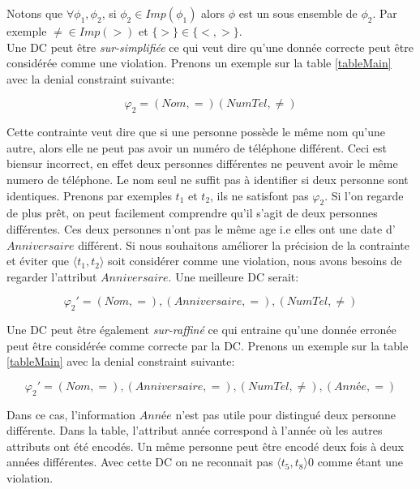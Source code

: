 \documentclass[letterpaper, 12pt]{report}
\theoremstyle{definition}
\begin{document}
Notons que $\forall \phi_1,\phi_2$, si $\phi_2 \in Imp(\phi_1)$ alors $\phi$ est un sous ensemble de $\phi_2$. Par exemple $\neq \in Imp(>)$ et $\{ > \} \in \{<,> \}$.\\

Une DC peut être \emph{sur-simplifiée} ce qui veut dire qu'une donnée correcte peut être considérée comme une violation. Prenons un exemple sur la table \ref{tableMain} avec la denial constraint suivante:

$$\varphi_2 = (Nom,=)(NumTel,\neq) $$

Cette contrainte veut dire que si une personne possède le même nom qu'une autre, alors elle ne peut pas avoir un numéro de téléphone différent. Ceci est biensur incorrect, en effet deux personnes différentes ne peuvent avoir le même numero de téléphone. Le nom seul ne suffit pas à identifier si deux personne sont identiques. Prenons par exemples $t_1$ et $t_2$, ils ne satisfont pas $\varphi_2$. Si l'on regarde de plus prêt, on peut facilement comprendre qu'il s'agit de deux personnes différentes. Ces deux personnes n'ont pas le même age i.e elles ont une date d'$Anniversaire$ différent. Si nous souhaitons améliorer la précision de la contrainte et éviter que $\langle t_1,t_2\rangle$ soit considérer comme une violation, nous avons besoins de regarder l'attribut $Anniversaire$. Une meilleure DC serait:

$$\varphi_2' = (Nom,=),(Anniversaire,=),(NumTel,\neq) $$

Une DC peut être également \emph{sur-raffiné} ce qui entraine qu'une donnée erronée peut être considérée comme correcte par la DC. Prenons un exemple sur la table \ref{tableMain} avec la denial constraint suivante:

$$\varphi_2' = (Nom,=),(Anniversaire,=),(NumTel,\neq),(Année,=) $$

Dans ce cas, l'information $Année$ n'est pas utile pour distingué deux personne différente. Dans la table, l'attribut année correspond à l'année où les autres attributs ont été encodés. Un même personne peut être encodé deux fois à deux années différentes. Avec cette DC on ne reconnait pas $\langle t_5,t_8 \rangle0$ comme étant une violation.
\end{document}
